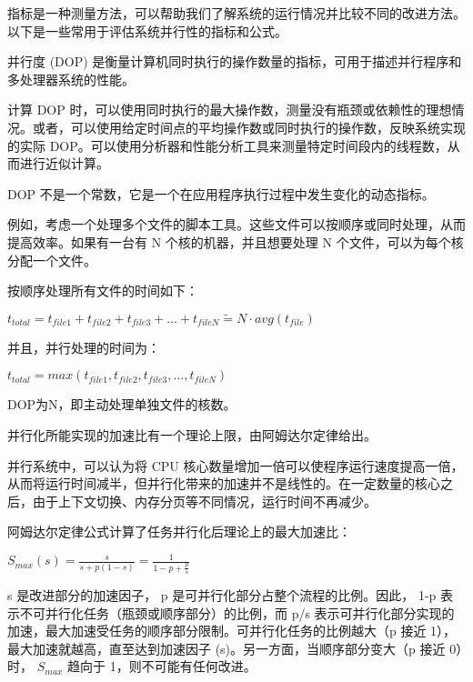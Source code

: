
指标是一种测量方法，可以帮助我们了解系统的运行情况并比较不同的改进方法。以下是一些常用于评估系统并行性的指标和公式。


并行度 (DOP) 是衡量计算机同时执行的操作数量的指标，可用于描述并行程序和多处理器系统的性能。

计算 DOP 时，可以使用同时执行的最大操作数，测量没有瓶颈或依赖性的理想情况。或者，可以使用给定时间点的平均操作数或同时执行的操作数，反映系统实现的实际 DOP。可以使用分析器和性能分析工具来测量特定时间段内的线程数，从而进行近似计算。

DOP 不是一个常数，它是一个在应用程序执行过程中发生变化的动态指标。

例如，考虑一个处理多个文件的脚本工具。这些文件可以按顺序或同时处理，从而提高效率。如果有一台有 N 个核的机器，并且想要处理 N 个文件，可以为每个核分配一个文件。

按顺序处理所有文件的时间如下：

\begin{center}
$t_{total} = t_{file1} + t_{file2} + t_{file3} + ... + t_{fileN} \widetilde{=} N · avg(t_{file}) $
\end{center}

并且，并行处理的时间为：

\begin{center}
$t_{total} = max(t_{file1}, t_{file2}, t_{file3}, ..., t_{fileN}) $
\end{center}

DOP为N，即主动处理单独文件的核数。

并行化所能实现的加速比有一个理论上限，由阿姆达尔定律给出。


并行系统中，可以认为将 CPU 核心数量增加一倍可以使程序运行速度提高一倍，从而将运行时间减半，但并行化带来的加速并不是线性的。在一定数量的核心之后，由于上下文切换、内存分页等不同情况，运行时间不再减少。

阿姆达尔定律公式计算了任务并行化后理论上的最大加速比：

\begin{center}
$S_{max}(s) = \frac{s}{s + p(1 - s)} = \frac{1}{1 - p + \frac{p}{s}}$
\end{center}

s 是改进部分的加速因子， p 是可并行化部分占整个流程的比例。因此， 1-p 表示不可并行化任务（瓶颈或顺序部分）的比例，而 p/s 表示可并行化部分实现的加速，最大加速受任务的顺序部分限制。可并行化任务的比例越大（p 接近 1），最大加速就越高，直至达到加速因子 (s)。另一方面，当顺序部分变大（p 接近 0）时， $S_{max}$ 趋向于 1，则不可能有任何改进。

